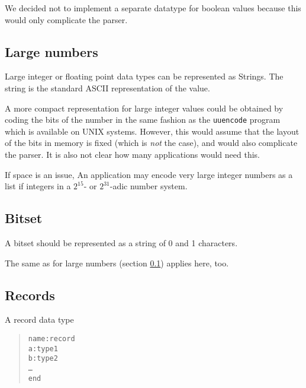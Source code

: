 \begin{notes}
  \item We decided not to implement a separate datatype for
  boolean values because this would only complicate the parser.
\end{notes}


\subsection{Large numbers}
\label{s:GML:LargeNumbers}
Large integer or floating point data types can be represented as
Strings.  The string is the standard ASCII representation of the
value.

\begin{notes}
  \item A more compact representation for large integer values
  could be obtained by coding the bits of the number in the same
  fashion as the \texttt{uuencode} program which is available on
  UNIX systems. However, this would assume that the layout of the
  bits in memory is fixed (which is \emph{not} the case), and
  would also complicate the parser. It is also not clear how many
  applications would need this.
  \item If space is an issue, An application may encode very
  large integer numbers as a list if integers in a $2^{15}$- or
  $2^{31}$-adic number system.
\end{notes}

\subsection{Bitset}
\label{s:GML:Bitset}
A bitset should be represented as a string of 0 and 1 characters.

\begin{notes}
  \item The same as for large numbers (section
  \ref{s:GML:LargeNumbers}) applies here, too.
\end{notes}


\subsection{Records}

A record data type

\begin{quote}
\begin{alltt}
name: record
    a: type1
    b: type2
    \ldots{}
end
\end{alltt}
\end{quote}

